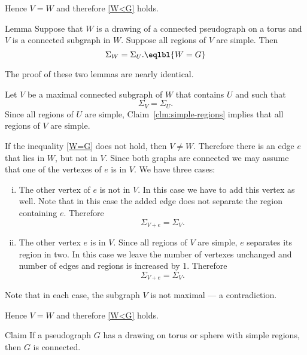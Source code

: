 Hence $V=W$ and therefore \ref{W<G} holds.
\qeds

\begin{thm}{Lemma}\label{lem:W=G}
Suppose that $W$ is a drawing of a connected pseudograph on a torus and $V$ is a connected subgraph in $W$.
Suppose all regions of $V$ are simple.
Then 
\[\Sigma_W= \Sigma_U.\eqlbl{W=G}\]
\end{thm}

The proof of these two lemmas are nearly identical.

 Let $V$ be a maximal connected subgraph of $W$ that contains $U$ and such that 
\[\Sigma_V= \Sigma_U.\]
Since all regions of $U$ are simple, Claim~\ref{clm:simple-regions} implies that all regions of $V$ are simple.

If the inequality \ref{W=G} does not hold, then $V\ne W$.
Therefore there is an edge $e$ that lies in $W$, but not in $V$.
Since both graphs are connected we may assume that one of the vertexes of $e$ is in $V$.
We have three cases:
\begin{enumerate}[(i)]
\item The other vertex of $e$ is not in $V$.
In this case we have to add this vertex as well.
Note that in this case the added edge does not separate the region containing $e$.
Therefore 
\[\Sigma_{V+e}=\Sigma_{V}.\]
\item The other vertex $e$ is in $V$.
Since all regions of $V$ are simple, $e$ separates its region in two.
In this case we leave the number of vertexes unchanged and number of edges and regions is increased by 1.
Therefore 
\[\Sigma_{V+e}=\Sigma_{V}.\] 
\end{enumerate}
Note that in each case, the subgraph $V$ is not maximal --- a contradiction.

Hence $V=W$ and therefore \ref{W<G} holds.
\qeds






















\begin{thm}{Claim}\label{clm:simple-connected}
If a pseudograph $G$ has a drawing on torus or sphere with simple regions, then $G$ is connected. 
\end{thm}



